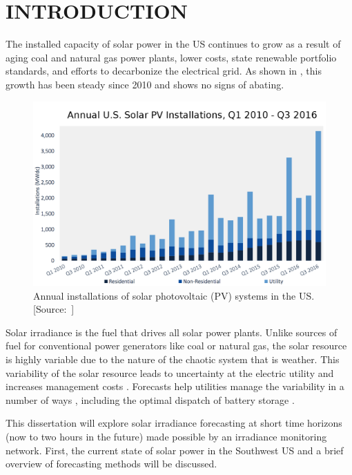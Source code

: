 \chapter{INTRODUCTION}
\label{chap:intro}

The installed capacity of solar power in the US continues to grow as a
result of aging coal and natural gas power plants, lower costs,
state renewable portfolio standards, and efforts to decarbonize the
electrical grid.
As shown in , this growth has been steady since 2010 and shows no signs of abating.

\begin{figure}[ht]
  \includegraphics[width=\textwidth]{figs/solar_installations.png}
  \caption[Annual installations of solar PV in the US]{Annual
    installations of solar photovoltaic (PV) systems in the
    US. [Source:~\cite{GTM/SEIA2016}]}
\label{fig:solarinstall}
\end{figure}

Solar irradiance is the fuel that drives all solar power plants.
Unlike sources of fuel for conventional power generators like coal or
natural gas, the solar resource is highly variable due to the nature
of the chaotic system that is weather.
This variability of the solar resource leads to uncertainty at the
electric utility and increases management costs \citep{Joskow2011}.
Forecasts help utilities manage the variability in a number of ways
\citep{Kleissl2013,Inman2013}, including the optimal dispatch of
battery storage \citep{Cormode2015}.

This dissertation will explore solar irradiance forecasting at short
time horizons (now to two hours in the future) made possible by an
irradiance monitoring network.
First, the current state of solar power in the Southwest US and a
brief overview of forecasting methods will be discussed.

